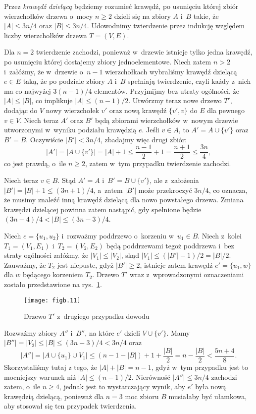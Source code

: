 
\subproblem %
Przez \emph{krawędź dzielącą} będziemy rozumieć krawędź, po usunięciu której zbiór wierzchołków drzewa o~mocy $n\ge2$ dzieli się na zbiory $A$ i~$B$ takie, że $|A|\le3n/4$ oraz $|B|\le3n/4$. Udowodnimy twierdzenie przez indukcję względem liczby wierzchołków drzewa $T=(V,E)$.

Dla $n=2$ twierdzenie zachodzi, ponieważ w~drzewie istnieje tylko jedna krawędź, po usunięciu której dostajemy zbiory jednoelementowe. Niech zatem $n>2$ i~załóżmy, że w~drzewie o~$n-1$ wierzchołkach wybraliśmy krawędź dzielącą $e\in E$ taką, że po podziale zbiory $A$ i~$B$ spełniają twierdzenie, czyli każdy z~nich ma co najwyżej $3(n-1)/4$ elementów. Przyjmijmy bez utraty ogólności, że $|A|\le|B|$, co implikuje $|A|\le(n-1)/2$. Utwórzmy teraz nowe drzewo $T'$, dodając do $V$ nowy wierzchołek $v'$ oraz nową krawędź $\{v',v\}$ do $E$ dla pewnego $v\in V$. Niech teraz $A'$ oraz $B'$ będą zbiorami wierzchołków w~nowym drzewie utworzonymi w~wyniku podziału krawędzią $e$. Jeśli $v\in A$, to $A'=A\cup\{v'\}$ oraz $B'=B$. Oczywiście $|B'|<3n/4$, zbadajmy więc drugi zbiór:
\[
	|A'| = \bigl|A\cup\{v'\}\bigr| = |A|+1 \le \frac{n-1}{2}+1 = \frac{n+1}{2} \le \frac{3n}{4},
\]
co jest prawdą, o~ile $n\ge2$, zatem w~tym przypadku twierdzenie zachodzi.

Niech teraz $v\in B$. Stąd $A'=A$ i~$B'=B\cup \{v'\}$, ale z~założenia $|B'|=|B|+1\le(3n+1)/4$, a~zatem $|B'|$ może przekroczyć $3n/4$, co oznacza, że musimy znaleźć inną krawędź dzielącą dla nowo powstałego drzewa. Zmiana krawędzi dzielącej powinna zatem nastąpić, gdy spełnione będzie $(3n-4)/4<|B|\le(3n-3)/4$.

Niech $e=\{u_1,u_2\}$ i~rozważmy poddrzewo o~korzeniu w~$u_1\in B$. Niech z~kolei $T_1=(V_1,E_1)$ i~$T_2=(V_2,E_2)$ będą poddrzewami tegoż poddrzewa i~bez straty ogólności załóżmy, że $|V_1|\le|V_2|$, skąd $|V_1|\le(|B'|-1)/2=|B|/2$. Zauważmy, że $T_2$ jest niepuste, gdyż $|B'|\ge2$, istnieje zatem krawędź $e'=\{u_1,w\}$ dla $w$ będącego korzeniem $T_2$. Drzewo $T'$ wraz z~wprowadzonymi oznaczeniami zostało przedstawione na rys.~\ref{fig:B-3a}.
\begin{figure}[ht]
	\begin{center}
		\texttt{[image: figb.11]}
	\end{center}
	\caption{Drzewo $T'$ z~drugiego przypadku dowodu} \label{fig:B-3a}
\end{figure}
Rozważmy zbiory $A''$ i~$B''$, na które $e'$ dzieli $V\cup\{v'\}$. Mamy $|B''|=|V_2|\le|B|\le(3n-3)/4<3n/4$ oraz
\[
	|A''| = \bigl|A\cup\{u_1\}\cup V_1\bigr| \le (n-1-|B|)+1+\frac{|B|}{2} = n-\frac{|B|}{2} < \frac{5n+4}{8}.
\]
Skorzystaliśmy tutaj z tego, że $|A|+|B|=n-1$, gdyż w~tym przypadku jest to mocniejszy warunek niż $|A|\le(n-1)/2$. Nierówność $|A''|\le3n/4$ zachodzi zatem, o~ile $n\ge4$, jednak jest to wystarczający wynik, aby $e'$ była nową krawędzią dzielącą, ponieważ dla $n=3$ moc zbioru $B$ musiałaby być ułamkowa, aby stosował się ten przypadek twierdzenia.

